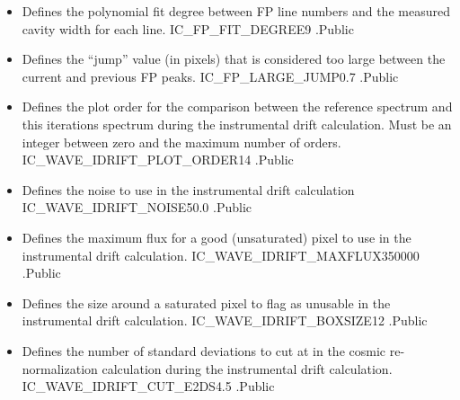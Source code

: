 \begin{itemize}
\item {} 
{Defines the polynomial fit degree between FP line numbers and the measured cavity width for each line.}
{IC\_FP\_FIT\_DEGREE}{9}
{\calWAVE}{\constantsfile}{\spirouWAVE.}{Public}

\item {} 
{Defines the ``jump'' value (in pixels) that is considered too large between the current and previous FP peaks.}
{IC\_FP\_LARGE\_JUMP}{0.7}
{\calWAVE}{\constantsfile}{ \spirouWAVE.}{Public}

\item {} 
{Defines the plot order for the comparison between the reference spectrum and this iterations spectrum during the instrumental drift calculation. Must be an integer between zero and the maximum number of orders.}
{IC\_WAVE\_IDRIFT\_PLOT\_ORDER}{14}
{\calWAVE}{\constantsfile}{\spirouPlot.}{Public}

\item {} 
{Defines the noise to use in the instrumental drift calculation}
{IC\_WAVE\_IDRIFT\_NOISE}{50.0}
{\calWAVE}{\constantsfile}{\spirouWAVE.}{Public}

\item {} 
{Defines the maximum flux for a good (unsaturated) pixel to use in the instrumental drift calculation.}
{IC\_WAVE\_IDRIFT\_MAXFLUX}{350000}
{\calWAVE}{\constantsfile}{\spirouWAVE.}{Public}

\item {} 
{Defines the size around a saturated pixel to flag as unusable in the instrumental drift calculation.}
{IC\_WAVE\_IDRIFT\_BOXSIZE}{12}
{\calWAVE}{\constantsfile}{\spirouWAVE.}{Public}

\item {} 
{Defines the number of standard deviations to cut at in the cosmic re-normalization calculation during the instrumental drift calculation.}
{IC\_WAVE\_IDRIFT\_CUT\_E2DS}{4.5}
{\calWAVE}{\constantsfile}{\spirouWAVE.}{Public}


\end{itemize}
